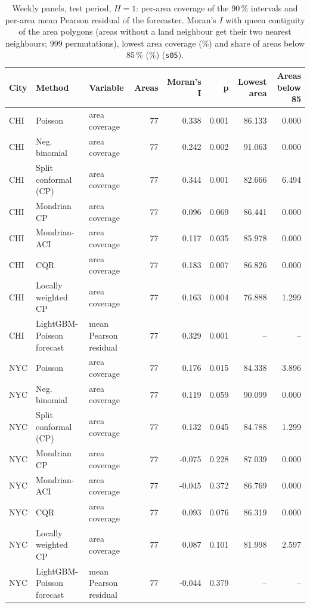 \documentclass[11pt]{article}
\begin{document}
\begin{table}[H]\centering\scriptsize\setlength{\tabcolsep}{3pt}
\caption{Weekly panels, test period, $H=1$: per-area coverage of the 90\,\% intervals and per-area mean Pearson residual of the forecaster. Moran's $I$ with queen contiguity of the area polygons (areas without a land neighbour get their two nearest neighbours; 999 permutations), lowest area coverage (\%) and share of areas below 85\,\% (\%) (\texttt{s05}).}\label{tab:s12}
\begin{tabularx}{\linewidth}{ll>{\raggedright\arraybackslash}Xrrrrr}\toprule
City & Method & Variable & Areas & Moran's I & p & Lowest area & Areas below 85\\\midrule
CHI & Poisson & area coverage & 77 & 0.338 & 0.001 & 86.133 & 0.000 \\
CHI & Neg. binomial & area coverage & 77 & 0.242 & 0.002 & 91.063 & 0.000 \\
CHI & Split conformal (CP) & area coverage & 77 & 0.344 & 0.001 & 82.666 & 6.494 \\
CHI & Mondrian CP & area coverage & 77 & 0.096 & 0.069 & 86.441 & 0.000 \\
CHI & Mondrian-ACI & area coverage & 77 & 0.117 & 0.035 & 85.978 & 0.000 \\
CHI & CQR & area coverage & 77 & 0.183 & 0.007 & 86.826 & 0.000 \\
CHI & Locally weighted CP & area coverage & 77 & 0.163 & 0.004 & 76.888 & 1.299 \\
CHI & LightGBM-Poisson forecast & mean Pearson residual & 77 & 0.329 & 0.001 & -- & -- \\
NYC & Poisson & area coverage & 77 & 0.176 & 0.015 & 84.338 & 3.896 \\
NYC & Neg. binomial & area coverage & 77 & 0.119 & 0.059 & 90.099 & 0.000 \\
NYC & Split conformal (CP) & area coverage & 77 & 0.132 & 0.045 & 84.788 & 1.299 \\
NYC & Mondrian CP & area coverage & 77 & -0.075 & 0.228 & 87.039 & 0.000 \\
NYC & Mondrian-ACI & area coverage & 77 & -0.045 & 0.372 & 86.769 & 0.000 \\
NYC & CQR & area coverage & 77 & 0.093 & 0.076 & 86.319 & 0.000 \\
NYC & Locally weighted CP & area coverage & 77 & 0.087 & 0.101 & 81.998 & 2.597 \\
NYC & LightGBM-Poisson forecast & mean Pearson residual & 77 & -0.044 & 0.379 & -- & -- \\

\end{tabularx}
\end{table}
\end{document}
